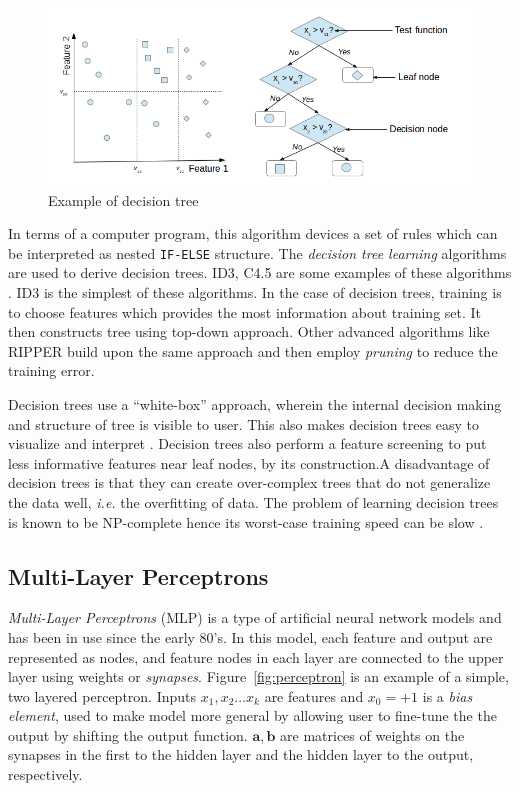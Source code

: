 \begin{figure}[h]
  \begin{center}
    \captionsetup{justification=centering}
    \includegraphics[scale=0.65]{figures/desctree.png}
    \caption{Example of decision tree}
    \label{fig:desctree}
  \end{center}
\end{figure}

In terms of a computer program, this algorithm devices a set of rules which can be interpreted as nested \texttt{IF-ELSE} structure. The \emph{decision tree learning} algorithms are used to derive decision trees. ID3, C4.5 are some examples of these algorithms \cite{Mitchell1997}. ID3 \cite{Quinlan1986} is the simplest of these algorithms. In the case of decision trees, training is to choose features which provides the most information about training set. It then constructs tree using top-down approach. Other advanced algorithms like RIPPER \cite{Cohen1995} build upon the same approach and then employ \emph{pruning} to reduce the training error.

Decision trees use a \enquote{white-box} approach, wherein the internal decision making and structure of tree is visible to user. This also makes decision trees easy to visualize and interpret \cite{Kotsiantis2013}. Decision trees also perform a feature screening to put less informative features near leaf nodes, by its construction.A disadvantage of decision trees is that they can create over-complex trees that do not generalize the data well, \emph{i.e.} the overfitting of data. The problem of learning decision trees is known to be NP-complete hence its worst-case training speed can be slow \cite{Hyafil1976}.

\subsection{Multi-Layer Perceptrons}
\emph{Multi-Layer Perceptrons} (MLP) is a type of artificial neural network models and has been in use since the early 80's. In this model, each feature and output are represented as nodes, and feature nodes in each layer are connected to the upper layer using weights or \emph{synapses}. Figure~\ref{fig:perceptron} is an example of a simple, two layered perceptron. Inputs $x_1, x_2 \ldots x_k$ are features and $x_0 = +1$ is a \emph{bias element}, used to make model more general by allowing user to fine-tune the the output by shifting the output function. $\boldsymbol{a,b}$ are matrices of weights on the synapses in the first to the hidden layer and the hidden layer to the output, respectively.

